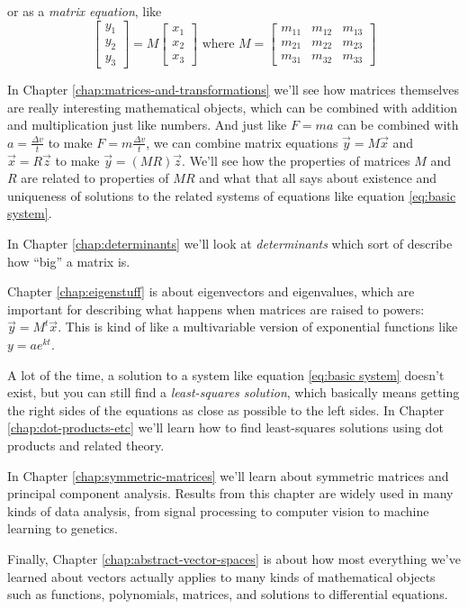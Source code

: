 \documentclass[11pt, letterpaper]{report}
\newcommand{\bbbvec}[3]{
  \begin{bmatrix} #1 \\ #2 \\ #3 \end{bmatrix}
}
\begin{document}
or as a \emph{matrix equation}, like
\[ \bbbvec{y_1}{y_2}{y_3} = M \bbbvec{x_1}{x_2}{x_3} \text{ where } M =
\begin{bmatrix}
  m_{11} & m_{12} & m_{13} \\
  m_{21} & m_{22} & m_{23} \\
  m_{31} & m_{32} & m_{33}
\end{bmatrix}
\]

In Chapter \ref{chap:matrices-and-transformations} we'll see how matrices themselves are really interesting mathematical objects, which can be combined with addition and multiplication just like numbers. And just like ${F=ma}$ can be combined with ${a=\frac{\Delta v}{t}}$ to make ${F = m\frac{\Delta v}{t}}$, we can combine matrix equations $\vec{y} = M \vec{x}$ and $\vec{x} = R \vec{z}$ to make $\vec{y} = (MR)\vec{z}$. We'll see how the properties of matrices $M$ and $R$ are related to properties of $MR$ and what that all says about existence and uniqueness of solutions to the related systems of equations like equation \ref{eq:basic system}.

In Chapter \ref{chap:determinants} we'll look at \emph{determinants} which sort of describe how ``big'' a matrix is.

Chapter \ref{chap:eigenstuff} is about eigenvectors and eigenvalues, which are important for describing what happens when matrices are raised to powers: ${\vec{y} = M^t \vec{x}}$. This is kind of like a multivariable version of exponential functions like ${y = ae^{kt}}$.

A lot of the time, a solution to a system like equation \eqref{eq:basic system} doesn't exist, but you can still find a \emph{least-squares solution}, which basically means getting the right sides of the equations as close as possible to the left sides. In Chapter \ref{chap:dot-products-etc} we'll learn how to find least-squares solutions using dot products and related theory.

In Chapter \ref{chap:symmetric-matrices} we'll learn about symmetric matrices and principal component analysis. Results from this chapter are widely used in many kinds of data analysis, from signal processing to computer vision to machine learning to genetics.

Finally, Chapter \ref{chap:abstract-vector-spaces} is about how most everything we've learned about vectors actually applies to many kinds of mathematical objects such as functions, polynomials, matrices, and solutions to differential equations.
\end{document}
